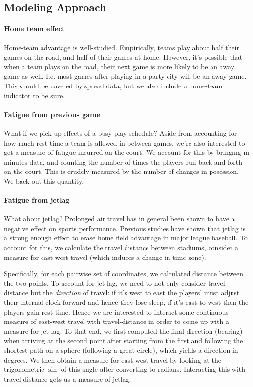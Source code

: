 \documentclass[letterpaper,12pt]{article}
\begin{document}
\subsection{Modeling Approach}

\paragraph{Home team effect}
Home-team advantage is well-studied.\citep{jones07, jones08}  
Empirically, teams play about half their games on the road, and half of their games at home. However,
it's possible that when a team plays on the road, their next game is more likely to be
an away game as well. I.e. most games after playing in a party city will be an away game.
This should be covered by spread data, but we also include
a home-team indicator to be sure.

\paragraph{Fatigue from previous game}
What if we pick up effects of a busy play schedule?
Aside from accounting for how much rest time a team is allowed in between games,
we're also interested to get a measure of
fatigue incurred on the court.
We account for this by bringing in minutes data, and counting the number of 
times the players run back and forth on the court. This is crudely measured
by the number of changes in posession. We back out this quantity.

\paragraph{Fatigue from jetlag}
What about jetlag? Prolonged air travel has in general been shown
to have a negative effect on sports performance.\citep{leeandgalvez}
Previous studies have shown that jetlag is a strong enough effect
to erase home field advantage in major league baseball.\citep{songetal}
To account for this, we calculate the travel distance between stadiums,
consider a measure for east-west travel (which induces a change in time-zone).

Specifically, for each pairwise set of coordinates, we calculated distance between the two
points.\citep{sp} To account for jet-lag, we need to not only consider travel distance
but the \emph{direction} of travel: if it's west to east the players' must adjust their internal
clock forward and hence they lose sleep, if it's east to west then the players gain rest time.
Hence we are interested to interact some continuous measure of east-west travel with
travel-distance in order to come up with a measure for jet-lag.
To that end, we first computed the final direction 
(bearing) when arriving at the 
second point after starting from the first and following the shortest path on a sphere 
(following a great circle), which yields a direction in degrees. 
We then obtain a measure for east-west travel by looking at the trigonometric-$\sin$ of this angle after converting to radians.
Interacting this with travel-distance gets us a measure of jetlag.\citep{lallensack}
\end{document}

